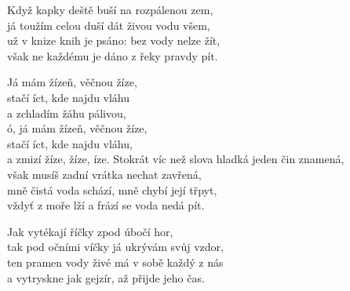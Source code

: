 
\ve
Když kapky deště buší na rozpálenou zem,\\
já toužím celou duší dát živou vodu všem,\\
už v knize knih je psáno: bez vody nelze žít,\\
však ne každému je dáno z řeky pravdy pít.

Já mám žízeň, věčnou žíze,\\
stačí íct, kde najdu vláhu\\
a zchladím žáhu pálivou,\\
ó, já mám žízeň, věčnou žíze,\\
stačí íct, kde najdu vláhu,\\
a zmizí žíze, žíze, íze.
\ve
Stokrát víc než slova hladká jeden čin znamená,\\
však musíš zadní vrátka nechat zavřená,\\
mně čistá voda schází, mně chybí její třpyt,\\
vždyť z moře lží a frází se voda nedá pít.


Jak vytékají říčky zpod úbočí hor,\\
tak pod očními víčky já ukrývám svůj vzdor,\\
ten pramen vody živé má v sobě každý z nás\\
a vytryskne jak gejzír, až přijde jeho čas.

\esong
